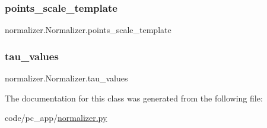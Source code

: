 \subsubsection{\texorpdfstring{points\+\_\+scale\+\_\+template}{points\_scale\_template}}
{\footnotesize\ttfamily normalizer.\+Normalizer.\+points\+\_\+scale\+\_\+template}

\mbox{\label{classnormalizer_1_1Normalizer_ae6fdb25c519b72b0f95cc4b2ce150f45}} 
\subsubsection{\texorpdfstring{tau\+\_\+values}{tau\_values}}
{\footnotesize\ttfamily normalizer.\+Normalizer.\+tau\+\_\+values}



The documentation for this class was generated from the following file\+:\begin{DoxyCompactItemize}
\item 
code/pc\+\_\+app/\hyperlink{normalizer_8py}{normalizer.\+py}\end{DoxyCompactItemize}
